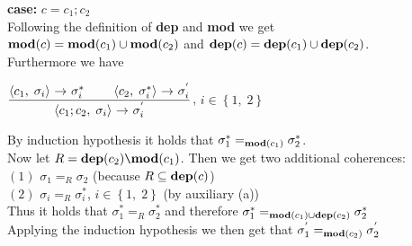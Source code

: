 \documentclass[12pt,a4paper]{article}
\newcommand{\eRelation}[2]{$\dfrac{\text{#1}}{\text{#2}}$}
\newcommand{\eState}[2]{$\left\langle \text{#1},\; \text{#2}\right\rangle$}
\newcommand{\eRule}[3]{\eState{#1}{#2} $\rightarrow$ #3}
\newcommand{\Mod}[0]{\text{\textbf{mod}}}
\newcommand{\dep}[0]{\text{\textbf{dep}}}
\begin{document}
	\indent\indent \textbf{case:} $c=${\boldmath $c_{1};c_{2}$}\\
	
	\indent\indent Following the definition of \textbf{dep} and \textbf{mod} we get\\\indent\indent $\Mod(c)=\Mod(c_{1})\cup \Mod(c_2)$ and $\dep(c)=\dep(c_{1})\cup \dep(c_{2})$.\\
	
	\indent\indent Furthermore we have
	\begin{center}
		\eRelation
			{\eRule{$c_{1}$}{$\sigma_{i}$}{$\sigma_{i}^{*}$} \qquad \eRule{$c_{2}$}{$\sigma_{i}^{*}$}{$\sigma_{i}^{'}$}}
			{\eRule{$c_{1};c_{2}$}{$\sigma_{i}$}{$\sigma_{i}^{'}$}}, $i\in \left\lbrace 1,\; 2\right\rbrace$
	\end{center}
	
	\indent\indent By induction hypothesis it holds that $\sigma_{1}^{*}=_{\Mod(c_{1})}\sigma_{2}^{*}$.\\
	\indent\indent Now let $R=\dep(c_{2})\verb|\|\Mod(c_{1})$. Then we get two additional coherences:\\
	\indent\indent\indent $(1)$ \quad $\sigma_{1}=_{R}\sigma_{2}$ (because $R\subseteq \dep(c)$)\\
	\indent\indent\indent $(2)$ \quad $\sigma_{i}=_{R}\sigma_{i}^{*}$, $i\in \left\lbrace 1,\; 2\right\rbrace$ (by auxiliary (a))\\
	\indent\indent Thus it holds that $\sigma_{1}^{*}=_{R}\sigma_{2}^{*}$ and therefore $\sigma_{1}^{*}=_{\Mod(c_1)\cup\dep(c_2)}\sigma_{2}^{*}$\\
	\indent\indent Applying the induction hypothesis we then get that $\sigma_{1}^{'}=_{\Mod(c_2)}\sigma_{2}^{'}$\\
	
\end{document}
